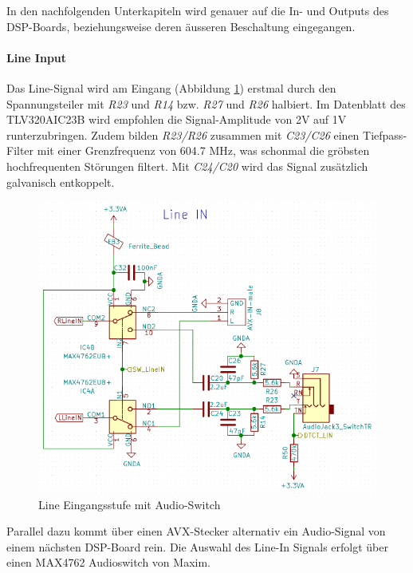 In den nachfolgenden Unterkapiteln wird genauer auf die In- und Outputs des DSP-Boards, beziehungsweise deren äusseren Beschaltung eingegangen.


\paragraph{Line Input}
\label{par:LineIN}
Das Line-Signal wird am Eingang (Abbildung \ref{fig:Schema_LineIN}) erstmal durch den Spannungsteiler mit \textit{R23} und \textit{R14} bzw. \textit{R27} und \textit{R26} halbiert. Im Datenblatt des TLV320AIC23B \cite{tlv320} wird empfohlen die Signal-Amplitude von 2V auf 1V runterzubringen. Zudem bilden \textit{R23/R26} zusammen mit \textit{C23/C26}  einen Tiefpass-Filter mit einer Grenzfrequenz von 604.7 MHz, was schonmal die gröbsten hochfrequenten Störungen filtert. Mit \textit{C24/C20} wird das Signal zusätzlich galvanisch entkoppelt.

\begin{figure} [H]
\begin{center}
 \includegraphics[scale=0.5]{../graphics/Schema_LineIN.png}
\caption{Line Eingangsstufe mit Audio-Switch}
\label{fig:Schema_LineIN}
\end{center}
\end{figure}

Parallel dazu kommt über einen AVX-Stecker alternativ ein Audio-Signal von einem nächsten DSP-Board rein. Die Auswahl des Line-In Signals erfolgt über einen MAX4762 \cite{max4762} Audioswitch von Maxim.


